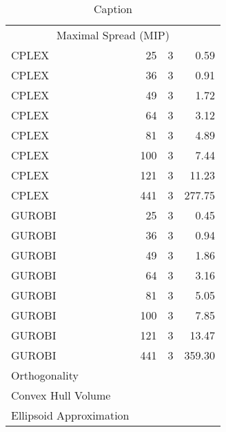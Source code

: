 \documentclass{article}
\begin{document}
\begin{table}[]
\begin{tabular}{lrrr}
			\multicolumn{4}{c}{Maximal Spread (MIP)}  \\
			CPLEX                       & 25    & 3         & 0.59      \\
			CPLEX                       & 36    & 3         & 0.91      \\
			CPLEX                       & 49    & 3         & 1.72      \\
			CPLEX                       & 64    & 3         & 3.12      \\
			CPLEX                       & 81    & 3         & 4.89      \\
			CPLEX                       & 100   & 3         & 7.44      \\
			CPLEX                       & 121   & 3         & 11.23     \\
			CPLEX                       & 441   & 3         & 277.75    \\
			
			GUROBI                      & 25    & 3         & 0.45      \\
			GUROBI                      & 36    & 3         & 0.94      \\
			GUROBI                      & 49    & 3         & 1.86      \\
			GUROBI                      & 64    & 3         & 3.16      \\
			GUROBI                      & 81    & 3         & 5.05      \\
			GUROBI                      & 100   & 3         & 7.85      \\
			GUROBI                      & 121   & 3         & 13.47     \\
			GUROBI                      & 441   & 3         & 359.30    \\
			
			Orthogonality               &  \\
			Convex Hull Volume          &  \\
			Ellipsoid Approximation     &  \\
			\bottomrule
		\end{tabular}
		\caption{Caption}
		\label{tab:my_label}
	\end{table}
	
\end{document}
